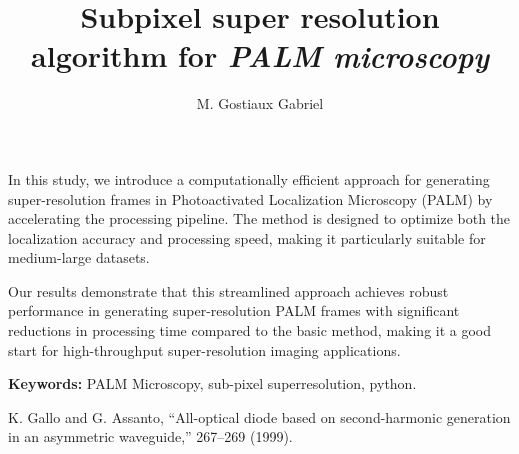 \documentclass[10pt,letterpaper]{article}
\begin{document}
\title{Subpixel super resolution algorithm for \textit{PALM microscopy}}

\author{M. Gostiaux Gabriel}

\address{M. Gabriel Gostiaux, Master of Science student, Institute of Optics, \\ Palaiseau, 91 120, France}




\begin{abstract*}
In this study, we introduce a computationally efficient approach for generating super-resolution frames in Photoactivated Localization Microscopy (PALM) by accelerating the processing pipeline. The method is designed to optimize both the localization accuracy and processing speed, making it particularly suitable for medium-large datasets.

Our results demonstrate that this streamlined approach achieves robust performance in generating super-resolution PALM frames with significant reductions in processing time compared to the basic method, making it a good start for high-throughput super-resolution imaging applications.

\textbf{Keywords:} PALM Microscopy, sub-pixel superresolution, python. 

\end{abstract*}


\begin{thebibliography}{99}

 K. Gallo and G. Assanto, ``All-optical diode based on second-harmonic generation in an asymmetric waveguide,''  267--269 (1999).

\end{thebibliography}

\end{document}
